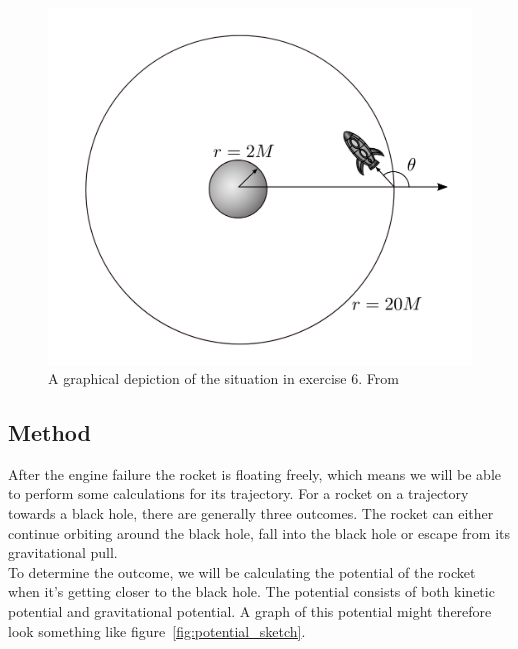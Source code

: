 \documentclass[reprint,english,notitlepage]{revtex4-2}
\begin{document}
        \begin{figure}[h]
            \centering
            \includegraphics[scale=0.3]{setup6}
            \caption{A graphical depiction of the situation in exercise 6. From~\parencite[][page 6]{part9}}\label{fig:setup6}
        \end{figure}


    \subsection{Method}\label{subsec:method6}
        After the engine failure the rocket is floating freely, which means we will be able to perform some calculations for its trajectory.
        For a rocket on a trajectory towards a black hole, there are generally three outcomes.
        The rocket can either continue orbiting around the black hole, fall into the black hole or escape from its gravitational pull.\\

        To determine the outcome, we will be calculating the potential of the rocket when it's getting closer to the black hole.
        The potential consists of both kinetic potential and gravitational potential.
        A graph of this potential might therefore look something like figure~\ref{fig:potential_sketch}.
\end{document}
